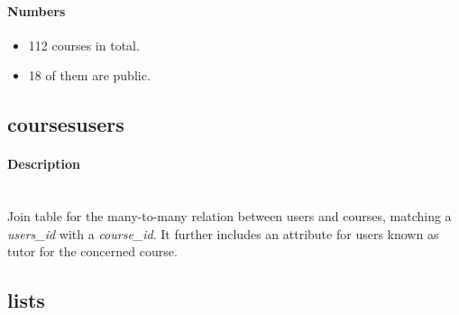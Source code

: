 \documentclass[../main.tex]{subfiles}
\begin{document}
\paragraph{Numbers} %
\begin{itemize}
	\setlength\itemsep{0em}
	\item 112 courses in total.
	\item 18 of them are public.
\end{itemize}


\subsection{coursesusers} %
\begin{figure}
  \vspace{-20pt}
  \begin{center}
  \end{center}
  \vspace{-20pt}
\end{figure}

\paragraph{Description}~\\ %
Join table for the many-to-many relation between users and courses, matching a \emph{users\_id} with a \emph{course\_id}. It further includes an attribute for users known as tutor for the concerned course.




\subsection{lists} %
\label{sub:lists}
\end{document}
